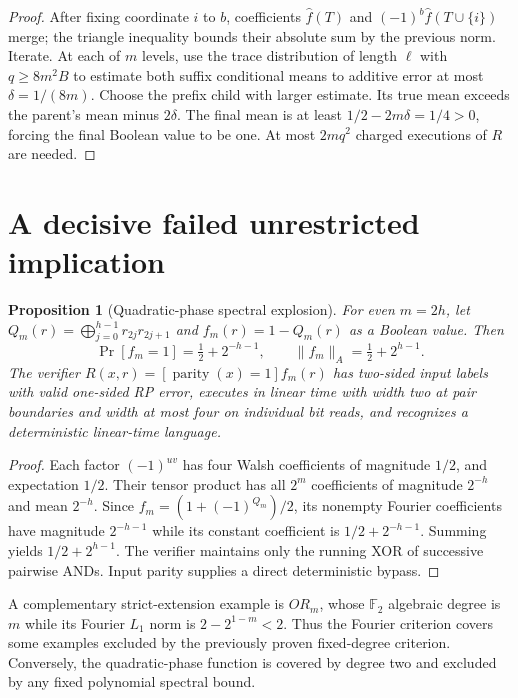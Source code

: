 \documentclass[11pt]{article}
\newtheorem{proposition}{Proposition}
\begin{document}
\begin{proof}
After fixing coordinate $i$ to $b$, coefficients $\widehat f(T)$ and $(-1)^b\widehat f(T\cup\{i\})$ merge; the triangle inequality bounds their absolute sum by the previous norm. Iterate. At each of $m$ levels, use the trace distribution of length $\ell$ with $q\ge8m^2B$ to estimate both suffix conditional means to additive error at most $\delta=1/(8m)$. Choose the prefix child with larger estimate. Its true mean exceeds the parent's mean minus $2\delta$. The final mean is at least $1/2-2m\delta=1/4>0$, forcing the final Boolean value to be one. At most $2mq^2$ charged executions of $R$ are needed.
\end{proof}
\section{A decisive failed unrestricted implication}
\begin{proposition}[Quadratic-phase spectral explosion]
For even $m=2h$, let $Q_m(r)=\bigoplus_{j=0}^{h-1}r_{2j}r_{2j+1}$ and $f_m(r)=1-Q_m(r)$ as a Boolean value. Then
\[
\Pr[f_m=1]=\tfrac12+2^{-h-1},\qquad
\|f_m\|_A=\tfrac12+2^{h-1}.
\]
The verifier $R(x,r)=[\operatorname{parity}(x)=1]f_m(r)$ has two-sided input labels with valid one-sided RP error, executes in linear time with width two at pair boundaries and width at most four on individual bit reads, and recognizes a deterministic linear-time language.
\end{proposition}
\begin{proof}
Each factor $(-1)^{uv}$ has four Walsh coefficients of magnitude $1/2$, and expectation $1/2$. Their tensor product has all $2^m$ coefficients of magnitude $2^{-h}$ and mean $2^{-h}$. Since $f_m=(1+(-1)^{Q_m})/2$, its nonempty Fourier coefficients have magnitude $2^{-h-1}$ while its constant coefficient is $1/2+2^{-h-1}$. Summing yields $1/2+2^{h-1}$. The verifier maintains only the running XOR of successive pairwise ANDs. Input parity supplies a direct deterministic bypass.
\end{proof}
A complementary strict-extension example is $OR_m$, whose $\mathbb F_2$ algebraic degree is $m$ while its Fourier $L_1$ norm is $2-2^{1-m}<2$. Thus the Fourier criterion covers some examples excluded by the previously proven fixed-degree criterion. Conversely, the quadratic-phase function is covered by degree two and excluded by any fixed polynomial spectral bound.
\end{document}
